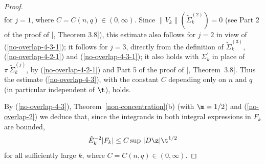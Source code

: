 \documentclass[a4paper,11pt]{amsart}
\begin{document}
\begin{proof}
\begin{equation*}
\end{equation*}
for $j=1$, where $C = C(n, q) \in (0, \infty).$ Since $\|V_{k}\|(\widetilde{\Sigma}_{k}^{(2)}) = 0$ (see Part 2 of the proof of [\cite{A}, Theorem 3.8]), this estimate also follows for $j=2$ in view of (\ref{no-overlap-4-3-1}); it follows for $j=3$, directly from the definition of $\widetilde{\Sigma}_{k}^{(3)}$, (\ref{no-overlap-4-2-1}) and (\ref{no-overlap-4-3-1}); it also holds with $\Sigma_{k}^{\prime}$ in place of $\pi \, \widetilde{\Sigma}_{k}^{(j)}$, by (\ref{no-overlap-4-2-1}) and Part 5 of the proof of 
[\cite{A}, Theorem~3.8].  Thus the estimate (\ref{no-overlap-4-3}), with 
the constant $C$ depending only on $n$ and $q$ (in particular independent of $\t$), holds.

By (\ref{no-overlap-4-3}), Theorem~\ref{non-concentration}(b) (with $\m  = 1/2$) 
and (\ref{no-overlap-2}) we deduce that, since the integrands in both integral
expressions in  $F_{k}$ are bounded, 
\begin{equation}\label{no-overlap-5}
{\hat E}_{k}^{-2}|F_{k}| \leq C \sup \, |D\z| \t^{1/2}
\end{equation}
for all sufficiently large $k$, where $C = C(n, q) \in (0, \infty).$


\end{proof}
\end{document}
